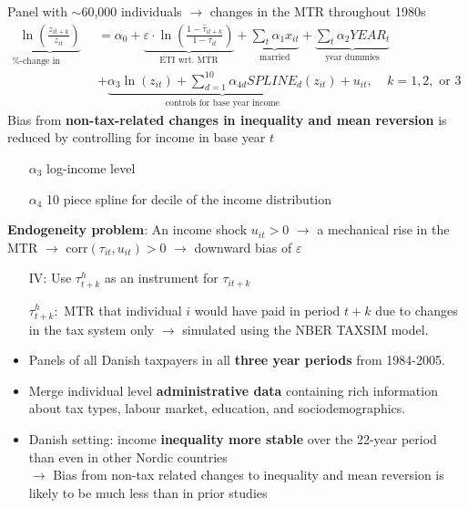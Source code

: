 \documentclass[8pt]{beamer}
\begin{document}
\begin{frame}{\citet{gruber2002elasticity}}
  Panel with $\sim$60,000 individuals $\rightarrow$ changes in the MTR throughout 1980s
  \begin{equation}
    \begin{split}
      \underbrace{\ln\left(\frac{z_{it+k}}{z_{it}}\right)}_\text{\%-change in income} &= \alpha_0 + \underbrace{\varepsilon\cdot \ln\left(\frac{1-\hat{\tau}_{it+k}}{1-\tau_{it}}\right)}_\text{ETI wrt. MTR} + \underbrace{\sum_t\alpha_1 x_{it}}_\text{married} + \underbrace{\sum_t \alpha_2YEAR_t}_\text{year dummies} \\
       &+\underbrace{ \alpha_3\ln(z_{it}) + \sum_{d=1}^{10}\alpha_{4d}SPLINE_d(z_{it}) }_\text{controls for base year income} + u_{it},\ \ \ \ \ k=1,2,\text{ or }3
      \label{eq:IV}
    \end{split}
  \end{equation}
  Bias from \textbf{non-tax-related changes in inequality and mean reversion } is reduced by controlling for income in base year $t$
  \begin{itemize}
    \item[$\alpha_3$] log-income level
    \item[$\alpha_4$] 10 piece spline for decile of the income distribution
  \end{itemize}
  \textbf{Endogeneity problem}: An income shock $u_{it}>0$ $\rightarrow$ a mechanical rise in the MTR $\rightarrow$ corr$(\tau_{it},u_{it})>0$ $\rightarrow$ downward bias of $\varepsilon$
  \begin{itemize}
    \item[IV:] Use $\tau^h_{t+k}$ as an instrument for $\tau_{it+k}$
    \item[$\tau^h_{t+k}:$] MTR that individual $i$ would have paid in period $t+k$ due to changes in the tax system only $\rightarrow$ simulated using the NBER TAXSIM model.
  \end{itemize}
\end{frame}


\begin{frame}{\citet{kleven2014estimating}}
  \begin{itemize}
    \item Panels of all Danish taxpayers in all \textbf{three year periods} from 1984-2005.
    \item Merge individual level \textbf{administrative data} containing rich information about tax types, labour market, education, and sociodemographics.
    \item Danish setting: income \textbf{inequality more stable} over the 22-year period than even in other Nordic countries \\
    $\rightarrow$ Bias from non-tax related changes to inequality and mean reversion is likely to be much less than in prior studies
  \end{itemize}
\end{frame}
\end{document}
